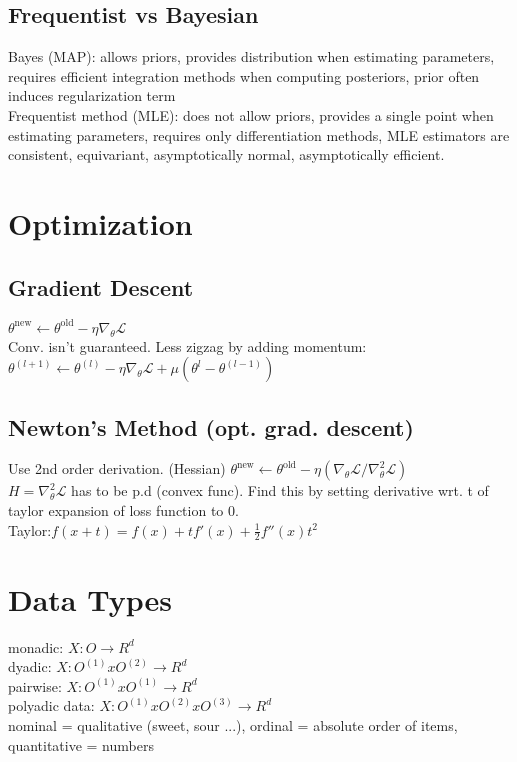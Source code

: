 \subsection*{Frequentist vs Bayesian}
Bayes (MAP): allows priors, provides distribution when estimating parameters, requires efficient integration methods when computing posteriors, prior often induces regularization term \\
Frequentist method (MLE): does not allow priors, provides a single point when estimating parameters, requires only differentiation methods, MLE estimators are consistent, equivariant, asymptotically normal, asymptotically efficient. 

\section*{Optimization}
\subsection*{Gradient Descent}
$\theta^{\mathrm{new}}\leftarrow\theta^{\mathrm{old}}-\eta\nabla_{\theta}\mathcal{L}$\\
Conv. isn't guaranteed.
Less zigzag by adding momentum: $\theta^{(l+1)}\leftarrow\theta^{(l)}-\eta\nabla_{\theta}\mathcal{L}+\mu(\theta^{l}-\theta^{(l-1)})$

\subsection*{Newton's Method (opt. grad. descent)}
Use 2nd order derivation. (Hessian)
$\theta^{\mathrm{new}}\leftarrow\theta^{\mathrm{old}}-\eta(\nabla_{\theta}\mathcal{L}/\nabla^2_{\theta}\mathcal{L})$\\
$H=\nabla^2_{\theta}\mathcal{L}$ has to be p.d (convex func).
Find this by setting derivative wrt. t of taylor expansion of loss function to 0. \\
Taylor:$f(x+t)=f(x)+t f'(x)+\frac{1}{2}f''(x)t^2$

\section*{Data Types}
monadic: $X: O \rightarrow R^d$ \\
dyadic: $X: O^{(1)} x O^{(2)} \rightarrow R^d $ \\
pairwise: $X: O^{(1)} x O^{(1)} \rightarrow R^d$ \\
polyadic data: $X: O^{(1)} x O^{(2)} x O^{(3)} \rightarrow R^d $ \\
nominal = qualitative (sweet, sour ...), ordinal = absolute order of items, quantitative = numbers
